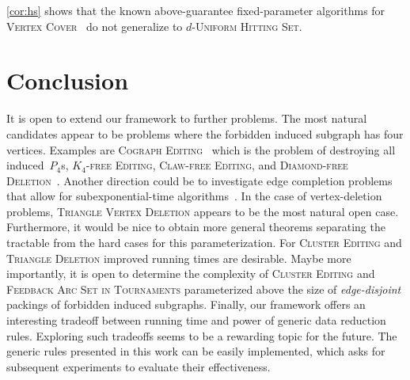 \documentclass[envcountsame,numbook,smallextended]{svjour3}
\newcommand{\shorten}[1]{}
\numberwithin{equation}{section}
\numberwithin{figure}{section}
\begin{document}
  
\noindent \cref{cor:hs} shows that the known above-guarantee fixed-parameter algorithms for \textsc{Vertex Cover}~\cite{RO09,CPPW13,LNR+14,GP15} do not generalize to \(d\)-\textsc{Uniform Hitting Set}.

\section{Conclusion}
\label{sec:conclusion}
It is open to extend our framework to further problems. The
most natural candidates appear to be problems where the forbidden induced subgraph has four vertices. Examples are \textsc{Cograph Editing}~\cite{LWGC12} which is
the problem of destroying all induced~$P_4$s, \textsc{$K_4$-free
  Editing}, \textsc{Claw-free Editing}, and \textsc{Diamond-free Deletion}~\cite{FGKNU11,SS15}. Another direction could be to investigate edge completion problems that allow for subexponential-time algorithms~\cite{DFPV15}. In the case of
vertex-deletion problems, \textsc{Triangle Vertex Deletion} appears to
be the most natural open case. Furthermore, it would be nice to obtain
more general theorems separating the tractable from the hard cases for
this parameterization.
For \textsc{Cluster Editing} and \textsc{Triangle Deletion} improved
running times \shorten{by better search trees} are desirable. Maybe more
importantly, it is open to determine the complexity of \textsc{Cluster
  Editing} and \textsc{Feedback Arc Set in Tournaments} parameterized
above the size of \emph{edge-disjoint} packings of forbidden
induced subgraphs.
Finally,  our framework offers an interesting tradeoff between
running time and power of generic data reduction rules. Exploring such
tradeoffs seems to be a rewarding topic for the future. The generic
rules presented in this work can be easily implemented, which asks for
subsequent experiments to evaluate their effectiveness.


\end{document}
